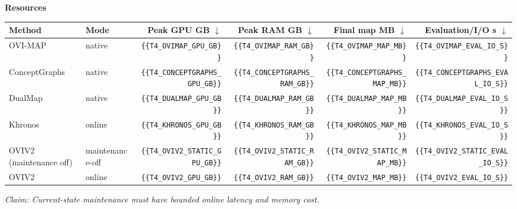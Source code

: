 \begin{table}[t]
\begin{tabular}{llrrrrrrrr}
\bottomrule
\end{tabular}
\par
\vspace{4pt}
\textbf{Resources}\\
\begin{tabular}{llrrrr}
\toprule
Method & Mode & Peak GPU GB $\downarrow$ & Peak RAM GB $\downarrow$ & Final map MB $\downarrow$ & Evaluation/I/O s $\downarrow$ \\
\midrule
OVI-MAP & native & \verb|{{T4_OVIMAP_GPU_GB}}| & \verb|{{T4_OVIMAP_RAM_GB}}| & \verb|{{T4_OVIMAP_MAP_MB}}| & \verb|{{T4_OVIMAP_EVAL_IO_S}}| \\
ConceptGraphs & native & \verb|{{T4_CONCEPTGRAPHS_GPU_GB}}| & \verb|{{T4_CONCEPTGRAPHS_RAM_GB}}| & \verb|{{T4_CONCEPTGRAPHS_MAP_MB}}| & \verb|{{T4_CONCEPTGRAPHS_EVAL_IO_S}}| \\
DualMap & native & \verb|{{T4_DUALMAP_GPU_GB}}| & \verb|{{T4_DUALMAP_RAM_GB}}| & \verb|{{T4_DUALMAP_MAP_MB}}| & \verb|{{T4_DUALMAP_EVAL_IO_S}}| \\
Khronos & online & \verb|{{T4_KHRONOS_GPU_GB}}| & \verb|{{T4_KHRONOS_RAM_GB}}| & \verb|{{T4_KHRONOS_MAP_MB}}| & \verb|{{T4_KHRONOS_EVAL_IO_S}}| \\
OVIV2 (maintenance off) & maintenance-off & \verb|{{T4_OVIV2_STATIC_GPU_GB}}| & \verb|{{T4_OVIV2_STATIC_RAM_GB}}| & \verb|{{T4_OVIV2_STATIC_MAP_MB}}| & \verb|{{T4_OVIV2_STATIC_EVAL_IO_S}}| \\
OVIV2 & online & \verb|{{T4_OVIV2_GPU_GB}}| & \verb|{{T4_OVIV2_RAM_GB}}| & \verb|{{T4_OVIV2_MAP_MB}}| & \verb|{{T4_OVIV2_EVAL_IO_S}}| \\
\bottomrule
\end{tabular}
\par
\smallskip
\noindent\textit{Claim: Current-state maintenance must have bounded online latency and memory cost.}
\end{table}

